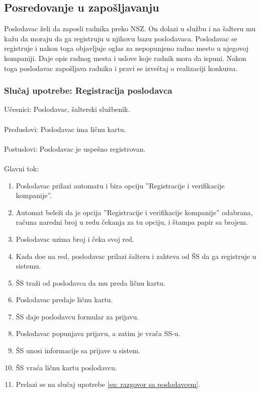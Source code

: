 \subsection{Posredovanje u zapo\v sljavanju}

Poslodavac \v zeli da zaposli radnika preko NSZ. On dolazi u slu\v zbu i na \v salteru mu ka\v zu da moraju da ga registruju u njihovu bazu poslodavaca. Poslodavac se registruje i nakon toga objavljuje oglas za nepopunjeno radno mesto u njegovoj kompaniji. Daje opis radnog mesta i uslove koje radnik mora da ispuni. Nakon toga poslodavac zapo\v sljava radnika i pravi se izve\v staj o realizaciji konkursa. 


\subsubsection{Slu\v caj upotrebe: Registracija poslodavca}

\noindent Učesnici: Poslodavac, šalterski službenik.
\\
\\ Preduslovi: Poslodavac ima ličnu kartu.
\\
\\ Postuslovi: Poslodavac je uspešno registrovan.
\\
\\ Glavni tok:
\begin{enumerate}
\item Poslodavac prilazi automatu i bira opciju ''Registracije i verifikacije kompanije''.
	\item Automat bele\v zi da je opcija ''Registracije i verifikacije kompanije'' odabrana, ra\v cuna naredni broj u redu \v cekanja za tu opciju, i \v stampa papir sa brojem.
	\item Poslodavac uzima broj i \v ceka svoj red.
	\item Kada do\dj e na red, poslodavac prilazi \v salteru i zahteva od \v SS da ga registruje u sistemu.
	\item \v SS tra\v zi od poslodavca da mu preda li\v cnu kartu.
	\item Poslodavac predaje ličnu kartu. 
	\item \v SS daje poslodavcu formular za prijavu.
    \item Poslodavac popunjava prijavu, a zatim je vra\v ca SS-u.
	\item \v SS unosi informacije sa prijave u sistem.
	\item \v SS vra\' ca ličnu kartu poslodavcu.
	\item Prelazi se na slu\v caj upotrebe \ref{su: razgovor sa poslodavcem}.
\end{enumerate}



